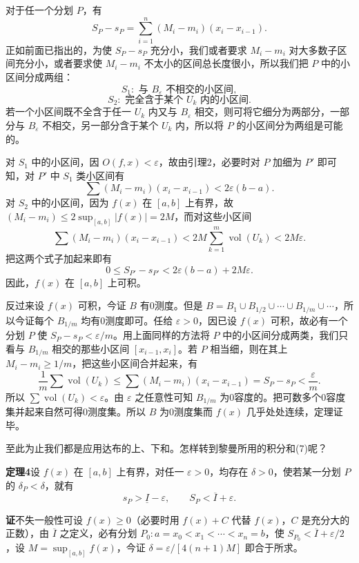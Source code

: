 对于任一个分划 $P$，有
\[
 S_P-s_P=\sum_{i=1}^{n}(M_i-m_i)(x_i-x_{i-1}).
\]
正如前面已指出的，为使 $S_P-s_P$ 充分小，我们或者要求 $M_i-m_i$ 对大多数子区间充分小，或者要求使 $M_i-m_i$ 不太小的区间总长度很小，所以我们把 $P$ 中的小区间分成两组：
\[
 S_1:\text{ 与 }B_\varepsilon\text{ 不相交的小区间},
\]
\[
 S_2:\text{ 完全含于某个 }U_k\text{ 内的小区间}.
\]
若一个小区间既不全含于任一 $U_k$ 内又与 $B_\varepsilon$ 相交，则可将它细分为两部分，一部分与 $B_\varepsilon$ 不相交，另一部分含于某个 $U_k$ 内，所以将 $P$ 的小区间分为两组是可能的。

对 $S_1$ 中的小区间，因 $O(f,x)<\varepsilon$，故由引理2，必要时对 $P$ 加细为 $P'$ 即可知，对 $P'$ 中 $S_1$ 类小区间有
\[
 \sum(M_i-m_i)(x_i-x_{i-1})<2\varepsilon(b-a).
\]
对 $S_2$ 中的小区间，因为 $f(x)$ 在 $[a,b]$ 上有界，故 $(M_i-m_i)\le2\sup_{[a,b]}|f(x)|=2M$，而对这些小区间
\[
 \sum(M_i-m_i)(x_i-x_{i-1})<2M\sum_{k=1}^{m}\operatorname{vol}(U_k)<2M\varepsilon.
\]
把这两个式子加起来即有
\[
 0\le S_{P'}-s_{P'}<2\varepsilon(b-a)+2M\varepsilon.
\]
因此，$f(x)$ 在 $[a,b]$ 上可积。

反过来设 $f(x)$ 可积，今证 $B$ 有0测度。但是 $B=B_1\cup B_{1/2}\cup\cdots\cup B_{1/m}\cup\cdots$，所以今证每个 $B_{1/m}$ 均有0测度即可。任给 $\varepsilon>0$，因已设 $f(x)$ 可积，故必有一个分划 $P$ 使 $S_P-s_P<\varepsilon/m$。用上面同样的方法将 $P$ 中的小区间分成两类，我们只看与 $B_{1/m}$ 相交的那些小区间 $[x_{i-1},x_i]$。若 $P$ 相当细，则在其上 $M_i-m_i\ge1/m$，把这些小区间合并起来，有
\[
 \frac1m\sum\operatorname{vol}(U_k)\le\sum(M_i-m_i)(x_i-x_{i-1})=S_P-s_P<\frac\varepsilon m.
\]
所以 $\sum\operatorname{vol}(U_k)<\varepsilon$。由 $\varepsilon$ 之任意性可知 $B_{1/m}$ 为0容度的。把可数多个0容度集并起来自然可得0测度集。所以 $B$ 为0测度集而 $f(x)$ 几乎处处连续，定理证毕。

至此为止我们都是应用达布的上、下和。怎样转到黎曼所用的积分和(7)呢？

\noindent\textbf{定理4}\quad 设 $f(x)$ 在 $[a,b]$ 上有界，对任一 $\varepsilon>0$，均存在 $\delta>0$，使若某一分划 $P$ 的 $\delta_P<\delta$，就有
\[
 s_P>\underline I-\varepsilon,\qquad S_P<\overline I+\varepsilon.
\]

\noindent\textbf{证}\quad 不失一般性可设 $f(x)\ge0$（必要时用 $f(x)+C$ 代替 $f(x)$，$C$ 是充分大的正数），由 $\overline I$ 之定义，必有分划 $P_0:a=x_0<x_1<\cdots<x_n=b$，使 $S_{P_0}<\overline I+\varepsilon/2$，设 $M=\sup_{[a,b]}f(x)$，今证 $\delta=\varepsilon/[4(n+1)M]$ 即合于所求。

